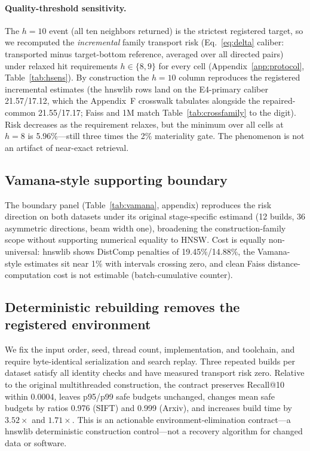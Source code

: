 \documentclass{article}
\begin{document}
\paragraph{Quality-threshold sensitivity.}
The $h{=}10$ event (all ten neighbors returned) is the strictest registered target, so we recomputed the
\emph{incremental} family transport risk (Eq.~\ref{eq:delta} caliber: transported minus target-bottom
reference, averaged over all directed pairs) under relaxed hit requirements $h\in\{8,9\}$ for every cell
(Appendix~\ref{app:protocol}, Table~\ref{tab:hsens}). By construction the $h{=}10$ column reproduces the registered incremental
estimates (the hnswlib rows land on the E4-primary caliber 21.57/17.12, which the Appendix~F crosswalk
tabulates alongside the repaired-common 21.55/17.17; Faiss and 1M match Table~\ref{tab:crossfamily} to
the digit). Risk decreases as the requirement relaxes, but the minimum over all cells at $h{=}8$ is
5.96\%---still three times the 2\% materiality gate. The phenomenon is not an artifact of near-exact
retrieval.

\subsection{Vamana-style supporting boundary}

The boundary panel (Table~\ref{tab:vamana}, appendix) reproduces the risk direction on both datasets under
its original stage-specific estimand (12 builds, 36 asymmetric directions, beam width one), broadening the
construction-family scope without supporting numerical equality to HNSW. Cost is equally non-universal:
hnswlib shows DistComp penalties of 19.45\%/14.88\%, the Vamana-style estimates sit near 1\% with
intervals crossing zero, and clean Faiss distance-computation cost is not estimable (batch-cumulative
counter).

\subsection{Deterministic rebuilding removes the registered environment}
\label{sec:contract}

We fix the input order, seed, thread count, implementation, and toolchain, and require byte-identical
serialization and search replay. Three repeated builds per dataset satisfy all identity checks and have
measured transport risk zero. Relative to the original multithreaded construction, the contract preserves
Recall@10 within 0.0004, leaves p95/p99 safe budgets unchanged, changes mean safe budgets by ratios 0.976
(SIFT) and 0.999 (Arxiv), and increases build time by $3.52\times$ and $1.71\times$. This is an actionable
environment-elimination contract---a hnswlib deterministic construction control---not a recovery algorithm
for changed data or software.
\end{document}
